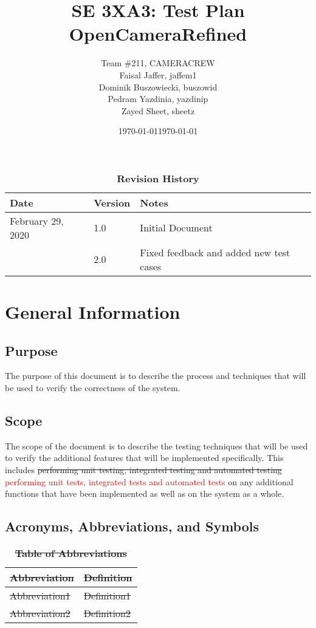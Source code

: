 \documentclass[12pt, titlepage]{article}
\title{SE 3XA3: Test Plan\\OpenCameraRefined}
\author{Team \#211, CAMERACREW
		\\ Faisal Jaffer, jaffem1
		\\ Dominik Buszowiecki, buszowid
		\\ Pedram Yazdinia, yazdinip
		\\ Zayed Sheet, sheetz
}
\date{\today}
\begin{document}
\maketitle

\tableofcontents
\listoftables
\listoffigures

\begin{table}[bp]
\caption{\bf Revision History}
\begin{tabularx}{\textwidth}{p{3cm}p{2cm}X}
\toprule {\bf Date} & {\bf Version} & {\bf Notes}\\
\midrule
February 29, 2020 & 1.0 & Initial Document\\
\date{\today} & 2.0 & Fixed feedback and added new test cases\\
\bottomrule
\end{tabularx}
\end{table}

\newpage


\section{General Information}

\subsection{Purpose}
    The purpose of this document is to describe the process and techniques that will be used to verify the correctness of the system.

\subsection{Scope}
    The scope of the document is to describe the testing techniques that will be used to verify the additional features that will be implemented specifically. This includes \sout{performing unit testing, integrated testing and automated testing} \textcolor{red}{performing unit tests, integrated tests and automated tests} on any additional functions that have been implemented as well as on the system as a whole.

\subsection{Acronyms, Abbreviations, and Symbols}
	
\begin{table}[hbp]
\caption{ \sout{\textbf{Table of Abbreviations}}} \label{Table}

\begin{tabularx}{\textwidth}{p{3cm}X}
\toprule
\textbf{\sout{Abbreviation}} & \textbf{\sout{Definition}} \\
\midrule
\sout{Abbreviation1} & \sout{Definition1}\\
\sout{Abbreviation2} & \sout{Definition2}\\
\bottomrule
\end{tabularx}

\end{table}
\end{document}
